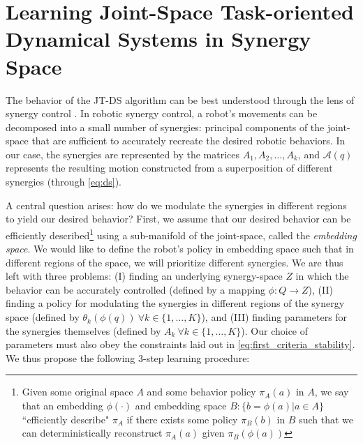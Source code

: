 \documentclass[letterpaper, 10 pt, journal, twoside, fleqn]{IEEEtran}
\begin{document}
\section{Learning \textbf{J}oint-Space \textbf{T}ask-oriented \textbf{D}ynamical \textbf{S}ystems in Synergy Space} 
\label{Sec:Learning}

The behavior of the JT-DS algorithm can be best understood through the lens of synergy control \cite{7954741}. In robotic synergy control, a robot's movements can be decomposed into a small number of synergies: principal components of the joint-space that are sufficient to accurately recreate the desired robotic behaviors. In our case, the synergies are represented by the matrices $A_1, A_2, \dots, A_k$, and $\mathcal{A}(q)$ represents the resulting motion constructed from a superposition of different synergies (through \eqref{eq:ds}). 

A central question arises: how do we modulate the synergies in different regions to yield our desired behavior? First, we assume that our desired behavior can be efficiently described\footnote{Given some original space $A$ and some behavior policy $\pi_A(a)$ in $A$, we say that an embedding $\phi(\cdot)$ and embedding space $B: \{b = \phi(a) | a \in A\}$ ``efficiently describe" $\pi_A$ if there exists some policy $\pi_B(b)$ in $B$ such that we can deterministically reconstruct $\pi_A(a)$ given $\pi_B(\phi(a))$} using a sub-manifold of the joint-space, called the \emph{embedding space}. We would like to define the robot's policy in embedding space such that in different regions of the space, we will prioritize different synergies. We are thus left with three problems: (I) finding an underlying synergy-space $Z$ in which the behavior can be accurately controlled (defined by a mapping $\phi: Q \rightarrow Z$), (II) finding a policy for modulating the synergies in different regions of the synergy space (defined by $\theta_k(\phi(q))~\forall k\in\{1,\dots,K\}$), and (III) finding parameters for the synergies themselves (defined by $A_k~\forall k\in\{1,\dots,K\}$). Our choice of parameters must also obey the constraints laid out in \eqref{eq:first_criteria_stability}. We thus propose the following 3-step learning procedure:
\end{document}
